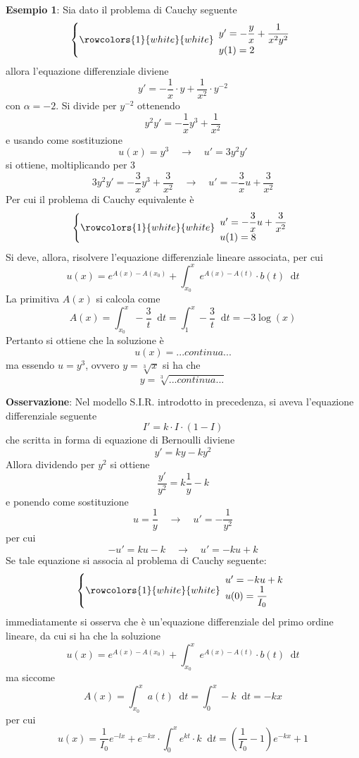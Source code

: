 \documentclass[a4paper]{extarticle}
\newcommand*\dif{\mathop{}\!\mathrm{d}}
\begin{document}
\vspace{2em}
\noindent
\textbf{Esempio 1}: Sia dato il problema di Cauchy seguente
\[\left\{
    \rowcolors{1}{white}{white}
    \begin{array}{lll}
        y'=-\dfrac{y}{x}+\dfrac{1}{x^2y^2}\\
        y(1)=2
    \end{array}
\right.\]
allora l'equazione differenziale diviene
\[y'=-\dfrac{1}{x} \cdot y + \dfrac{1}{x^2} \cdot y^{-2}\]
con $\alpha=-2$. Si divide per $y^{-2}$ ottenendo
\[y^2 y' = -\dfrac{1}{x} y^3 + \dfrac{1}{x^2}\]
e usando come sostituzione
\[u(x)=y^3 \hspace{1em} \rightarrow \hspace{1em} u'=3y^2 y'\]
si ottiene, moltiplicando per 3
\[3y^2 y' = - \dfrac{3}{x} y^3 + \dfrac{3}{x^2} \hspace{1em} \rightarrow \hspace{1em} u'=-\dfrac{3}{x} u + \dfrac{3}{x^2}\]
Per cui il problema di Cauchy equivalente è
\[\left\{
    \rowcolors{1}{white}{white}
    \begin{array}{lll}
        u'=-\dfrac{3}{x} u + \dfrac{3}{x^2}\\
        u(1)=8
    \end{array}
\right.\]
Si deve, allora, risolvere l'equazione differenziale lineare associata, per cui
\[u(x)=e^{A(x) - A(x_0)} + \int_{x_0}^x e^{A(x) - A(t)} \cdot b(t) \dif t\]
La primitiva $A(x)$ si calcola come
\[A(x) = \int_{x_0}^x -\dfrac{3}{t} \dif t = \int_{1}^x -\dfrac{3}{t} \dif t = -3 \log(x)\]
Pertanto si ottiene che la soluzione è
\[u(x) = ...continua...\]
ma essendo $u=y^3$, ovvero $y=\sqrt[3]{x}$ si ha che
\[y=\sqrt[3]{...continua...}\]

\vspace{2em}
\noindent
\textbf{Osservazione}: Nel modello S.I.R. introdotto in precedenza, si aveva l'equazione differenziale seguente
\[I'=k \cdot I \cdot (1-I)\]
che scritta in forma di equazione di Bernoulli diviene
\[y'=ky - ky^2\]
Allora dividendo per $y^2$ si ottiene
\[\dfrac{y'}{y^2} = k \dfrac{1}{y} - k\]
e ponendo come sostituzione
\[u=\dfrac{1}{y} \hspace{1em} \rightarrow \hspace{1em} u' = - \dfrac{1}{y^2}\]
per cui
\[-u'=ku-k \hspace{1em} \rightarrow \hspace{1em} u'=-ku+k\]
Se tale equazione si associa al problema di Cauchy seguente:
\[\left\{
    \rowcolors{1}{white}{white}
    \begin{array}{lll}
        u'=-ku+k\\
        u(0)=\dfrac{1}{I_0}
    \end{array}
\right.\]
immediatamente si osserva che è un'equazione differenziale del primo ordine lineare, da cui si ha che la soluzione
\[u(x)=e^{A(x)-A(x_0)} + \int_{x_0}^x e^{A(x) - A(t)} \cdot b(t) \dif t\]
ma siccome
\[A(x)=\int_{x_0}^x a(t) \dif t = \int_{0}^x -k \dif t = -kx\]
per cui
\[u(x)=\dfrac{1}{I_0} e^{-lx} + e^{-kx} \cdot \int_0^x e^{kt} \cdot k \dif t = \left(\dfrac{1}{I_0} -1\right) e^{-kx} + 1\]
\end{document}
